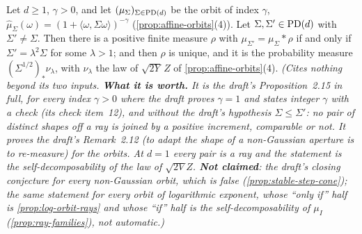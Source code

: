 \begin{proposition}
\label{prop:matern-steps}
\leanok
Let $d \ge 1$, $\gamma > 0$, and let $(\mu_\Sigma)_{\Sigma\in\mathrm{PD}(d)}$ be the \Matern{} orbit of index
$\gamma$, $\widehat\mu_\Sigma(\omega) = (1 + \langle\omega,\Sigma\omega\rangle)^{-\gamma}$
(\ref{prop:affine-orbits}(4)). Let $\Sigma, \Sigma' \in \mathrm{PD}(d)$ with $\Sigma' \ne \Sigma$. Then there
is a positive finite measure $\rho$ with $\mu_{\Sigma'} = \mu_\Sigma * \rho$ if and only if
$\Sigma' = \lambda^2\Sigma$ for some $\lambda > 1$; and then $\rho$ is unique, and it is the
probability measure $(\Sigma^{1/2})_*\nu_\lambda$, with $\nu_\lambda$ the law of $\sqrt{2Y}\,Z$ of
\ref{prop:affine-orbits}(4).
\statusT\quad\emph{(Cites nothing beyond its two inputs. \textbf{What it is worth.} It is the
draft's Proposition~2.15 in full, for every index $\gamma > 0$ where the draft proves $\gamma = 1$
and states integer $\gamma$ with a check (its check item~12), and without the draft's hypothesis
$\Sigma \le \Sigma'$: no pair of distinct shapes off a ray is joined by a positive increment,
comparable or not. It proves the draft's Remark~2.12 (\emph{to adapt the shape of a non-Gaussian
aperture is to re-measure}) for the \Matern{} orbits. At $d = 1$ every pair is a ray and the
statement is the self-decomposability of the law of $\sqrt{2V}Z$. \textbf{Not claimed}: the
draft's closing conjecture for every non-Gaussian orbit, which is false
(\ref{prop:stable-step-cone}); the same statement for every orbit of logarithmic exponent, whose
``only if'' half is \ref{prop:log-orbit-rays} and whose ``if'' half is the self-decomposability of
$\mu_I$ (\ref{prop:ray-families}), not automatic.)}
\end{proposition}

